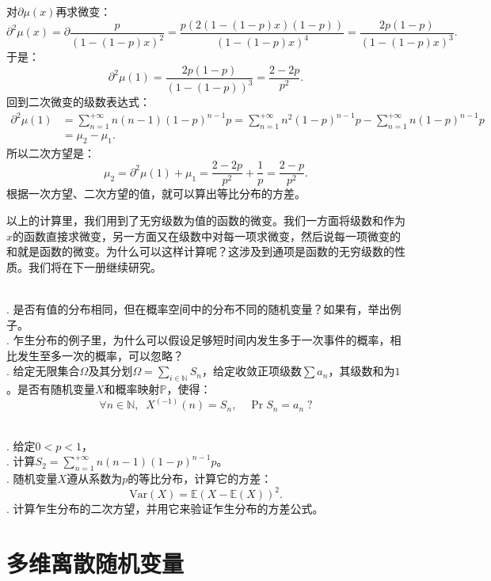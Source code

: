 \documentclass[12pt,UTF8,fontset=none]{ctexbook}
\begin{document}
对$\partial \mu(x)$再求微变：
\[
    \partial^2 \mu(x) = \partial \frac{p}{(1 - (1 - p)x)^2} = \frac{p(2(1 - (1 - p)x)(1 - p))}{(1 - (1 - p)x)^4} = \frac{2p(1 - p)}{(1 - (1 - p)x)^3}.
\]
于是：
$$ \partial^2 \mu(1) = \frac{2p(1 - p)}{(1 - (1 - p))^3} = \frac{2 - 2p}{p^2}. $$
回到二次微变的级数表达式：
\begin{align*}
    \partial^2 \mu(1) &= \sum_{n=1}^{+\infty} n(n - 1) (1 - p)^{n-1} p = \sum_{n=1}^{+\infty} n^2 (1 - p)^{n-1} p - \sum_{n=1}^{+\infty} n (1 - p)^{n-1} p \\
    &= \mu_2 - \mu_1.
\end{align*}
所以二次方望是：
\[
\mu_2 = \partial^2 \mu(1) + \mu_1 = \frac{2 - 2p}{p^2} + \frac{1}{p} = \frac{2 - p}{p^2}.
\]
根据一次方望、二次方望的值，就可以算出等比分布的方差。

以上的计算里，我们用到了无穷级数为值的函数的微变。我们一方面将级数和作为$x$的函数直接求微变，另一方面又在级数中对每一项求微变，然后说每一项微变的和就是函数的微变。为什么可以这样计算呢？这涉及到通项是函数的无穷级数的性质。我们将在下一册继续研究。

\begin{sk}
    \mbox{} \\
    . 是否有值的分布相同，但在概率空间中的分布不同的随机变量？如果有，举出例子。\\
    . 乍生分布的例子里，为什么可以假设足够短时间内发生多于一次事件的概率，相比发生至多一次的概率，可以忽略？\\
    . 给定无限集合$\Omega$及其分划$\Omega = \sum_{i\in\mathbb{N}} S_n$，给定收敛正项级数$\sum a_n$，其级数和为$1$。是否有随机变量$X$和概率映射$\mathbb{P}$，使得：
    $$ \forall n\in\mathbb{N}, \;\; X^{(-1)} (n) = S_n, \quad \Pr{S_n} = a_n \; ?$$
\end{sk}

\begin{xt}
    \mbox{} \\
    . 给定$0<p<1$，\\
    . 计算$S_2 = \sum_{n=1}^{+\infty} n(n - 1)(1 - p)^{n-1} p$。\\
    . 随机变量$X$遵从系数为$p$的等比分布，计算它的方差：
    $$ \mathrm{Var}(X) = \mathbb{E}(X - \mathbb{E}(X))^2.$$
    . 计算乍生分布的二次方望，并用它来验证乍生分布的方差公式。 \\
\end{xt}

\section{多维离散随机变量}
\end{document}
